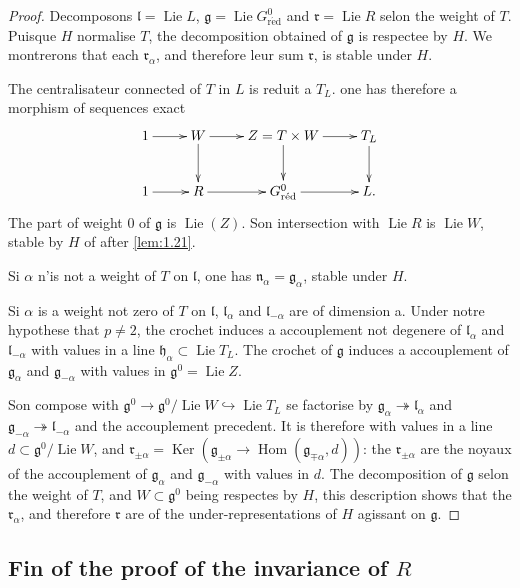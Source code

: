 \documentclass[11pt,a4paper]{article}
\theoremstyle{plain}
\theoremstyle{definition}
\DeclareMathOperator{\Hom}{Hom}
\DeclareMathOperator{\Ker}{Ker}
\DeclareMathOperator{\Lie}{Lie}
\newcommand{\red}{\mathrm{r\acute{e}d}}
\begin{document}
\begin{proof}
Decomposons $\mathfrak{l} = \Lie L$, $\mathfrak{g} = \Lie G^0_\red$ and $\mathfrak{r} = \Lie R$ selon the weight of $T$. Puisque $H$ normalise $T$, the decomposition obtained of $\mathfrak{g}$ is respectee by $H$. We montrerons that each $\mathfrak{r}_\alpha$, and therefore leur sum $\mathfrak{r}$, is stable under $H$.

The centralisateur connected of $T$ in $L$ is reduit a $T_L$. one has therefore a morphism of sequences exact
\[
\xymatrix{
1 \ar[r] & W \ar[r] \ar[d] & Z = T \times W \ar[r] \ar[d] & T_L \ar[d] \\
1 \ar[r] & R \ar[r] & G^0_\red \ar[r] & L.
}
\]
The part of weight $0$ of $\mathfrak{g}$ is $\Lie(Z)$. Son intersection with $\Lie R$ is $\Lie W$, stable by $H$ of after \ref{lem:1.21}.

Si $\alpha$ n'is not a weight of $T$ on $\mathfrak{l}$, one has $\mathfrak{n}_\alpha = \mathfrak{g}_\alpha$, stable under $H$.

Si $\alpha$ is a weight not zero of $T$ on $\mathfrak{l}$, $\mathfrak{l}_\alpha$ and $\mathfrak{l}_{-\alpha}$ are of dimension a. Under notre hypothese that $p \neq 2$, the crochet induces a accouplement not degenere of $\mathfrak{l}_\alpha$ and $\mathfrak{l}_{-\alpha}$ with values in a line $\mathfrak{h}_\alpha \subset \Lie T_L$. The crochet of $\mathfrak{g}$ induces a accouplement of $\mathfrak{g}_\alpha$ and $\mathfrak{g}_{-\alpha}$ with values in $\mathfrak{g}^0 = \Lie Z$.

Son compose with $\mathfrak{g}^0 \to \mathfrak{g}^0/\Lie W \hookrightarrow \Lie T_L$ se factorise by $\mathfrak{g}_\alpha \twoheadrightarrow \mathfrak{l}_\alpha$ and $\mathfrak{g}_{-\alpha} \twoheadrightarrow \mathfrak{l}_{-\alpha}$ and the accouplement precedent. It is therefore with values in a line $d \subset \mathfrak{g}^0/\Lie W$, and $\mathfrak{r}_{\pm\alpha} = \Ker(\mathfrak{g}_{\pm\alpha} \to \Hom(\mathfrak{g}_{\mp\alpha}, d))$: the $\mathfrak{r}_{\pm\alpha}$ are the noyaux of the accouplement of $\mathfrak{g}_\alpha$ and $\mathfrak{g}_{-\alpha}$ with values in $d$. The decomposition of $\mathfrak{g}$ selon the weight of $T$, and $W \subset \mathfrak{g}^0$ being respectes by $H$, this description shows that the $\mathfrak{r}_\alpha$, and therefore $\mathfrak{r}$ are of the under-representations of $H$ agissant on $\mathfrak{g}$.
\end{proof}

\subsection{Fin of the proof of the invariance of $R$}\label{sec:1.23}
\end{document}
